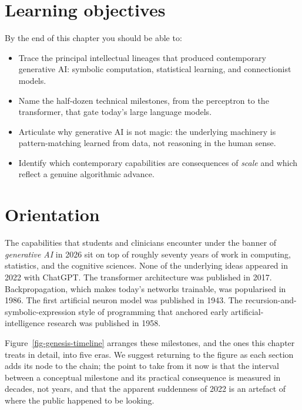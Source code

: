 \documentclass[
  letterpaper,
  11pt]{scrbook}
\providecommand{\tightlist}{%
  \setlength{\itemsep}{0pt}\setlength{\parskip}{0pt}}
\begin{document}
\section{Learning objectives}\label{learning-objectives}

By the end of this chapter you should be able to:

\begin{itemize}
\tightlist
\item
  Trace the principal intellectual lineages that produced contemporary
  generative AI: symbolic computation, statistical learning, and
  connectionist models.
\item
  Name the half-dozen technical milestones, from the perceptron to the
  transformer, that gate today's large language models.
\item
  Articulate why generative AI is not magic: the underlying machinery is
  pattern-matching learned from data, not reasoning in the human sense.
\item
  Identify which contemporary capabilities are consequences of
  \emph{scale} and which reflect a genuine algorithmic advance.
\end{itemize}

\section{Orientation}\label{orientation}

The capabilities that students and clinicians encounter under the banner
of \emph{generative AI} in 2026 sit on top of roughly seventy years of
work in computing, statistics, and the cognitive sciences. None of the
underlying ideas appeared in 2022 with ChatGPT. The transformer
architecture was published in 2017. Backpropagation, which makes today's
networks trainable, was popularised in 1986. The first artificial neuron
model was published in 1943. The recursion-and-symbolic-expression style
of programming that anchored early artificial-intelligence research was
published in 1958.

Figure~\ref{fig-genesis-timeline} arranges these milestones, and the
ones this chapter treats in detail, into five eras. We suggest returning
to the figure as each section adds its node to the chain; the point to
take from it now is that the interval between a conceptual milestone and
its practical consequence is measured in decades, not years, and that
the apparent suddenness of 2022 is an artefact of where the public
happened to be looking.
\end{document}
